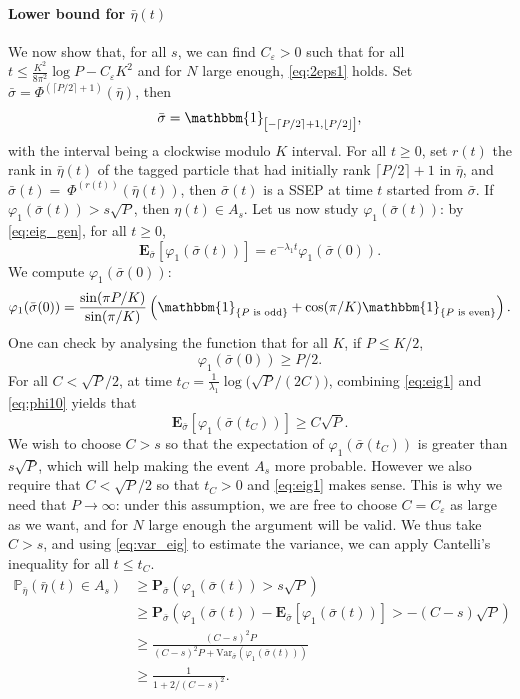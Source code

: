 \documentclass[11pt,a4paper]{article}
\newcommand{\un}{\mathbbm{1}}
\newcommand{\PP}{\mathbb{P}}
\newcommand{\bP}{\textbf{P}}
\newcommand\ent[1]{\lfloor #1 \rfloor}
\newcommand\entc[1]{\lceil #1 \rceil}
\newcommand{\eqs}[1]{\begin{equation}#1\end{equation}}
\newcommand{\eq}[2]{\begin{equation}\label{#1}#2\end{equation}}
\begin{document}
\paragraph{Lower bound for $\bar{\eta}(t)$} We now show that, for all $s$, we can find $C_\varepsilon>0$ such that for all $t \le \frac{K^2}{8\pi^2}\log P-C_\varepsilon K^2$ and for $N$ large enough, \eqref{eq:2eps1} holds. 
Set $\bar{\sigma}=\Phi^{(\entc{P/2}+1)}\left(\bar{\eta}\right)$, then
\eqs{\bar{\sigma} = \un_{ \left[-\entc{P/2}+1,\ent{P/2}\vphantom{\frac12}\right] },}
with the interval being a clockwise modulo $K$ interval.
For all $t\ge 0$, set $r(t)$ the rank in $\bar{\eta}(t)$ of the tagged particle that had initially rank $\entc{P/2}+1$ in $\bar{\eta}$, and $\bar{\sigma}(t)=~\Phi^{\left(r(t)\right)}\left(\bar{\eta}(t)\right)$, then $\bar{\sigma}(t)$ is a SSEP at time $t$ started from $\bar{\sigma}$. If $\varphi_1\left(\bar{\sigma}(t)\right) > s\sqrt{P}$, then $\eta(t)\in A_s$. Let us now study $\varphi_1\left(\bar{\sigma}(t)\right)$: by \eqref{eq:eig_gen}, for all $t\ge 0$,
\eq{eq:eig1}{\mathbf{E}_{\bar{\sigma}}\left[\varphi_1(\bar{\sigma}(t))\right] = e^{-\lambda_1 t}\varphi_1(\bar{\sigma}(0)).}
We compute $\varphi_1(\bar{\sigma}(0))$:
\eqs{\varphi_1(\bar{\sigma}(0)) = \frac{\sin(\pi P/K)}{\sin(\pi/K)}\left(\un_{\{P \text{ is odd}\}} + \cos(\pi/K)\un_{\{P \text{ is even}\}} \right) .}
One can check by analysing the function that for all $K$, if $P\le K/2$, 
\eq{eq:phi10}{\varphi_1(\bar{\sigma}(0))\ge P/2.} 
For all $C<\sqrt{P}/2$, at time $t_C = \frac{1}{\lambda_1}\log \big(\sqrt{P}/(2 C)\big)$, combining \eqref{eq:eig1} and \eqref{eq:phi10} yields that \eqs{\mathbf{E}_{\bar{\sigma}}\left[\varphi_1\left(\bar{\sigma}(t_C)\right)\right] \ge C\sqrt{P }.}
We wish to choose $C>s$ so that the expectation of $\varphi_1(\bar{\sigma}(t_C))$ is greater than  $s\sqrt{P}$, which will help making the event $A_s$ more probable. However we also require that $C<\sqrt{P}/2$ so that $t_C>0$ and \eqref{eq:eig1} makes sense. This is why we need that $P\to \infty$: under this assumption, we are free to choose $C = C_\varepsilon$ as large as we want, and for $N$ large enough the argument will be valid. 
We thus take $C > s$, and using \eqref{eq:var_eig} to estimate the variance, we can apply Cantelli's inequality for all $t \le t_C$.
\begin{align}
\PP_{\bar{\eta}}\left(\bar{\eta}(t) \in A_s\right) &\ge \bP_{\bar{\sigma}}\left(\varphi_1(\bar{\sigma}(t))> s\sqrt{P}\right) \nonumber\\
&\ge \bP_{\bar{\sigma}}\left(\varphi_1(\bar{\sigma}(t)) - \mathbf{E}_{\bar{\sigma}}\left[\varphi_1(\bar{\sigma}(t))\right] >-(C-s)\sqrt{P}\right) \nonumber\\
&\ge \frac{(C-s)^2 P}{(C-s)^2 P + \mathrm{Var}_{\bar{\sigma}}\left(\varphi_1(\bar{\sigma}(t))\right)} \nonumber\\
&\ge \frac{1}{1+2/(C-s)^2}.
\end{align}
\end{document}
